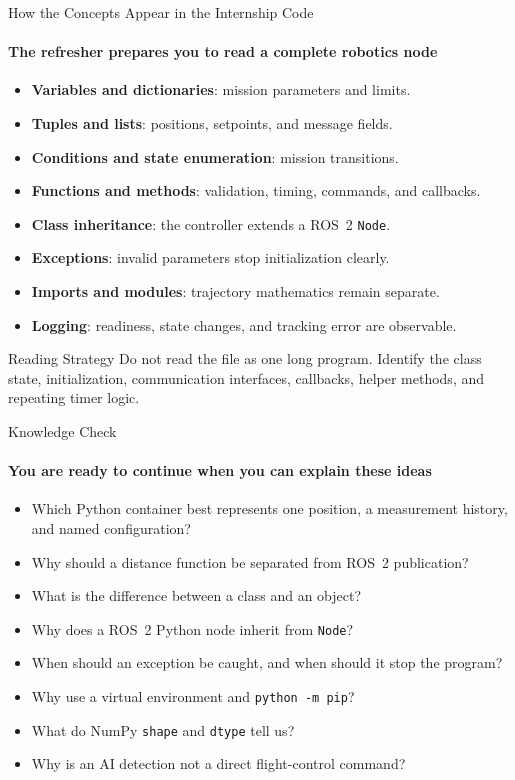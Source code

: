 \begin{frame}{How the Concepts Appear in the Internship Code}
\framesubtitle{The refresher prepares you to read a complete robotics node}
\footnotesize
\begin{itemize}
\item \textbf{Variables and dictionaries}: mission parameters and limits.
\item \textbf{Tuples and lists}: positions, setpoints, and message fields.
\item \textbf{Conditions and state enumeration}: mission transitions.
\item \textbf{Functions and methods}: validation, timing, commands, and callbacks.
\item \textbf{Class inheritance}: the controller extends a ROS~2 \texttt{Node}.
\item \textbf{Exceptions}: invalid parameters stop initialization clearly.
\item \textbf{Imports and modules}: trajectory mathematics remain separate.
\item \textbf{Logging}: readiness, state changes, and tracking error are observable.
\end{itemize}
\begin{exampleblock}{Reading Strategy}
Do not read the file as one long program. Identify the class state, initialization, communication interfaces, callbacks, helper methods, and repeating timer logic.
\end{exampleblock}
\end{frame}

\begin{frame}{Knowledge Check}
\framesubtitle{You are ready to continue when you can explain these ideas}
\begin{itemize}
\item Which Python container best represents one position, a measurement history, and named configuration?
\item Why should a distance function be separated from ROS~2 publication?
\item What is the difference between a class and an object?
\item Why does a ROS~2 Python node inherit from \texttt{Node}?
\item When should an exception be caught, and when should it stop the program?
\item Why use a virtual environment and \texttt{python -m pip}?
\item What do NumPy \texttt{shape} and \texttt{dtype} tell us?
\item Why is an AI detection not a direct flight-control command?
\end{itemize}
\end{frame}

